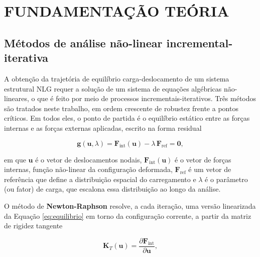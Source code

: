 


\section{FUNDAMENTAÇÃO TEÓRIA}
\label{sec:fundamentação}


\subsection{Métodos de análise não-linear incremental-iterativa}
\label{subsec:métodos}

A obtenção da trajetória de equilíbrio carga-deslocamento de um
sistema estrutural NLG requer a solução de um sistema de equações
algébricas não-lineares, o que é feito por meio de processos
incrementais-iterativos. Três métodos são tratados neste trabalho,
em ordem crescente de robustez frente a pontos críticos. Em todos
eles, o ponto de partida é o equilíbrio estático entre as forças
internas e as forças externas aplicadas, escrito na forma
residual

\begin{equation}
  \mathbf{g}(\mathbf{u}, \lambda) =
  \mathbf{F}_{\text{int}}(\mathbf{u}) - \lambda\,\mathbf{F}_{\text{ref}}
  = \mathbf{0},
  \label{eq:equilibrio}
\end{equation}

em que $\mathbf{u}$ é o vetor de deslocamentos nodais,
$\mathbf{F}_{\text{int}}(\mathbf{u})$ é o vetor de forças internas,
função não-linear da configuração deformada, $\mathbf{F}_{\text{ref}}$
é um vetor de referência que define a distribuição espacial do
carregamento e $\lambda$ é o parâmetro (ou fator) de carga, que
escalona essa distribuição ao longo da análise.

O método de \textbf{Newton-Raphson} resolve, a cada iteração, uma
versão linearizada da Equação \ref{eq:equilibrio} em torno da
configuração corrente, a partir da matriz de rigidez tangente

\begin{equation}
  \mathbf{K}_T(\mathbf{u}) =
  \frac{\partial \mathbf{F}_{\text{int}}}{\partial \mathbf{u}},
  \label{eq:rigidez-tangente}
\end{equation}

